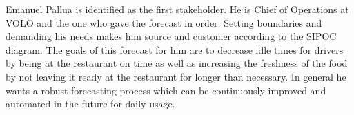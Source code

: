 \begin{table}[]
\centering
\caption{SIPOC Diagram derived from the five basic steps}
\label{tab:sipoc}
\end{table}
Emanuel Pallua is identified as the first stakeholder. He is Chief of Operations at VOLO and the one who gave the forecast in order. Setting boundaries and demanding his needs makes him source and customer according to the SIPOC diagram. The goals of this forecast for him are to decrease idle times for drivers by being at the restaurant on time as well as increasing the freshness of the food by not leaving it ready at the restaurant for longer than necessary. In general he wants a robust forecasting process which can be continuously improved and automated in the future for daily usage. \newline
